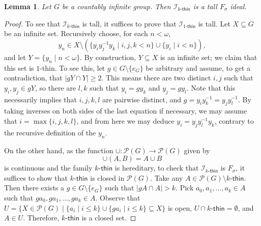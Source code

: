 \documentclass{amsart}
\newtheorem{lemma}[theorem]{Lemma}
\theoremstyle{definition}
\theoremstyle{remark}
\numberwithin{equation}{section}
\newcommand{\onethin}{1\text{-}\mathsf{thin}}
\newcommand{\kthin}{k\text{-}\mathsf{thin}}
\begin{document}


\begin{lemma} Let $G$ be a countably infinite group. Then $\mathcal{I}_{\kthin}$ is a tall $F_{\sigma}$ ideal. 
\end{lemma}
\begin{proof}
To see that $\mathcal{I}_{\kthin}$ is tall, it suffices to prove that $\mathcal I_{1\text{-}\mathsf{thin}}$ is tall. Let $X\subseteq G$ be an infinite set. Recursively choose, for each $n<\omega$, %
\begin{equation*}
    y_{n}\in X\setminus\left(\{y_i y_j^{-1} y_k \mid   i,j,k< n\}\cup\{y_i\mid  i< n\}\right),
\end{equation*}
and let $Y=\{y_n\mid  n<\omega\}$. By construction, $Y\subseteq X$ is an infinite set; we claim that this set is $1$-thin. To see this, let $g\in G\setminus\{e_{G}\}$ be arbitrary and assume, to get a contradiction, that $|gY\cap Y|\geq 2$. This means there are two distinct $i,j$ such that $y_i,y_j\in gY$, so there are $l,k$ such that $y_i=gy_k$ and $y_j=gy_l$. Note that this necessarily implies that $i,j,k,l$ are pairwise distinct, and $g=y_i y_k^{-1}=y_j y_l^{-1}$. By taking inverses on both sides of the last equation if necessary, we may assume that $i=\max\{i,j,k,l\}$, and from here we may deduce $y_i=y_j y_l^{-1} y_k$, contrary to the recursive definition of the $y_n$.

On the other hand, as the function $\cup \colon \mathcal{P}(G) \to \mathcal{P}(G)$ given by 
\[
  \cup(A, B) = A \cup B
\]
is continuous and the family $\kthin$ is hereditary, to check that $\mathcal{I}_{\kthin}$ is $F_{\sigma}$, it suffices to show that  $\kthin$ is closed in $\mathcal{P}(G)$. Take any $A \in \mathcal{P}(G)\setminus \kthin$. Then there exists a $g\in G \setminus \{e_{G}\}$ such that $\lvert gA\cap A\rvert>k$. Pick $a_0,a_1,\dots,a_k\in A$ such that  $ga_0,ga_1,\dots,ga_k\in A$. Observe that $U=\{X\in \mathcal{P}(G) \mid   \{a_i \mid   i\leq k\}\cup\{ga_i \mid   i\leq k\}\subseteq X\}$ is open, $U\cap \kthin=\emptyset$, and $A\in U$. Therefore, $\kthin$ is a closed set.
\end{proof}
\end{document}
